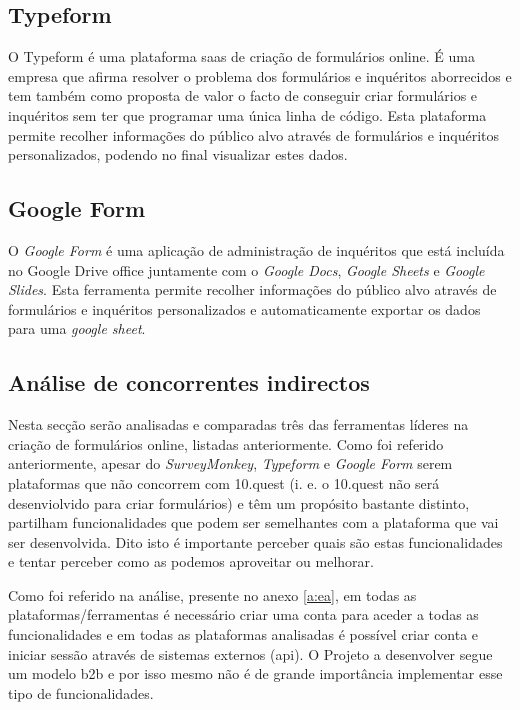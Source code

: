 \subsection{Typeform}
\label{typeformM}

O Typeform é uma plataforma \acrshort{saas} de criação de formulários online. É uma empresa que afirma resolver o problema dos formulários e inquéritos aborrecidos e tem também como proposta de valor o facto de conseguir criar formulários e inquéritos sem ter que programar uma única linha de código. Esta plataforma permite recolher informações do público alvo através de formulários e inquéritos personalizados, podendo no final visualizar estes dados. 


\subsection{Google Form}
\label{googleformM}

O \textit{Google Form} é uma aplicação de administração de inquéritos que está incluída no Google Drive office juntamente com o \textit{Google Docs}\cite{gdocs}, \textit{Google Sheets} e \textit{Google Slides}\cite{gslides}. Esta ferramenta permite recolher informações do público alvo através de formulários e inquéritos personalizados e automaticamente exportar os dados para uma \textit{google sheet}.

\subsection{Análise de concorrentes indirectos}

Nesta secção serão analisadas e comparadas três das ferramentas líderes na criação de formulários online, listadas anteriormente. Como foi referido anteriormente, apesar do \textit{SurveyMonkey}, \textit{Typeform} e \textit{Google Form} serem plataformas que não concorrem com 10.quest (i. e. o 10.quest não será desenviolvido para criar formulários) e têm um propósito bastante distinto, partilham funcionalidades que podem ser semelhantes com a plataforma que vai ser desenvolvida. Dito isto é importante perceber quais são estas funcionalidades e tentar perceber como as podemos aproveitar ou melhorar.

Como foi referido na análise, presente no anexo \ref{a:ea}, em todas as plataformas/ferramentas é necessário criar uma conta para aceder a todas as funcionalidades e em todas as plataformas analisadas é possível criar conta e iniciar sessão através de sistemas externos (\acrshort{api}). O Projeto a desenvolver segue um modelo \gls{b2b} e por isso mesmo não é de grande importância implementar esse tipo de funcionalidades.

